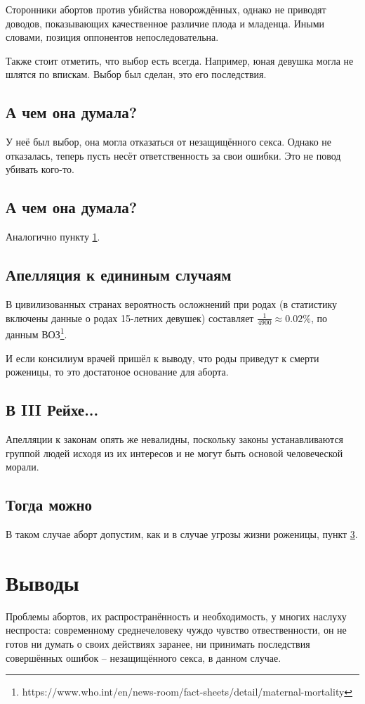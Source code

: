 \documentclass[a4paper,12pt]{report}
\begin{document}
        Сторонники абортов против убийства новорождённых, однако не приводят
        доводов, показывающих качественное различие плода и младенца. Иными словами,
        позиция оппонентов непоследовательна.

        Также стоит отметить, что выбор есть всегда. Например, юная девушка 
        могла не шлятся по впискам. Выбор был сделан, это его последствия.
    \section{А чем она думала?}\label{thing-about-it}
        У неё был выбор, она могла отказаться от незащищённого секса. Однако не отказалась, 
        теперь пусть несёт ответственность за свои ошибки. Это не повод убивать кого-то.
	\section{А чем она думала?}
        Аналогично пункту \ref{thing-about-it}.
    \section{Апелляция к едининым случаям}\label{ifdie}
        В цивилизованных странах вероятность осложнений при родах
        (в статистику включены данные о родах 15-летних девушек)
        составляет $ \frac{1}{4900} \approx 0.02\% $, по данным ВОЗ\footnote{https://www.who.int/en/news-room/fact-sheets/detail/maternal-mortality}.

        И если консилиум врачей пришёл к выводу, что роды приведут к 
        смерти роженицы, то это достатоное основание для аборта.
    \section{В III Рейхе...}\label{laws}
        Апелляции к законам опять же невалидны, поскольку законы устанавливаются группой 
        людей исходя из их интересов и не могут быть основой человеческой морали. 
	\section{Тогда можно}
        В таком случае аборт допустим, как и в случае угрозы жизни роженицы, пункт \ref{ifdie}.


\chapter{Выводы}
Проблемы абортов, их распространённость и необходимость, у многих наслуху неспроста: 
современному среднечеловеку чуждо чувство отвественности, он не готов ни думать о 
своих действиях заранее, ни принимать последствия совершённых ошибок -- незащищённого 
секса, в данном случае.
\end{document}
